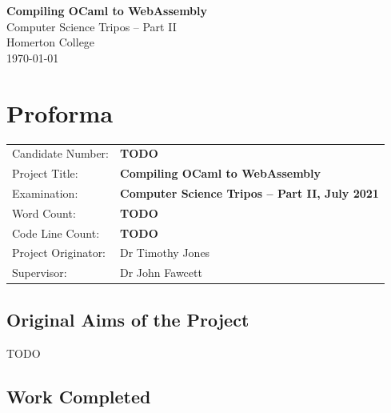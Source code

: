 \documentclass[12pt,a4paper,twoside,openright]{report}
\begin{document}





\pagestyle{empty}


\vspace*{60mm}
\begin{center}
\Huge
\textbf{Compiling OCaml to WebAssembly} \\[5mm]
Computer Science Tripos -- Part II \\[5mm]
Homerton College \\[5mm]
\today  %
\end{center}


\pagestyle{plain}

\chapter*{Proforma}

{\large
\begin{tabular}{ll}
Candidate Number:   & \bf TODO                       \\
Project Title:      & \bf Compiling OCaml to WebAssembly         \\
Examination:        & \bf Computer Science Tripos -- Part II, July 2021  \\
Word Count:         & \bf TODO \\
Code Line Count:    & \bf TODO \\
Project Originator: & Dr Timothy Jones                    \\
Supervisor:         & Dr John Fawcett                    \\
\end{tabular}
}

\section*{Original Aims of the Project}

TODO

\section*{Work Completed}
\end{document}
